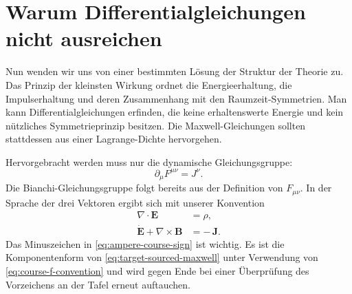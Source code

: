 \begin{classroomqa}
\end{classroomqa}

\begin{classroomqa}
\end{classroomqa}

\section{Warum Differentialgleichungen nicht ausreichen}

Nun wenden wir uns von einer bestimmten Lösung der Struktur der Theorie zu. Das Prinzip der kleinsten Wirkung ordnet die Energieerhaltung, die Impulserhaltung und deren Zusammenhang mit den Raumzeit-Symmetrien. Man kann Differentialgleichungen erfinden, die keine erhaltenswerte Energie und kein nützliches Symmetrieprinzip besitzen. Die Maxwell-Gleichungen sollten stattdessen aus einer Lagrange-Dichte hervorgehen.

Hervorgebracht werden muss nur die dynamische Gleichungsgruppe:
\begin{equation}
\partial_\mu F^{\mu\nu}=J^\nu.
\label{eq:target-sourced-maxwell}
\end{equation}
Die Bianchi-Gleichungsgruppe folgt bereits aus der Definition von \(F_{\mu\nu}\). In der Sprache der drei Vektoren ergibt sich mit unserer Konvention
\begin{align}
\nabla\cdot\mathbf E&=\rho,
\label{eq:gauss-source}
\\
\dot{\mathbf E}+\nabla\times\mathbf B&=-\,\mathbf J.
\label{eq:ampere-course-sign}
\end{align}
Das Minuszeichen in \eqref{eq:ampere-course-sign} ist wichtig. Es ist die Komponentenform von \eqref{eq:target-sourced-maxwell} unter Verwendung von \eqref{eq:course-f-convention} und wird gegen Ende bei einer Überprüfung des Vorzeichens an der Tafel erneut auftauchen.


